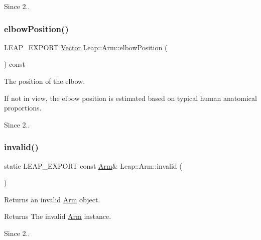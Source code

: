 \begin{DoxySince}{Since}
2.. 
\end{DoxySince}
\mbox{\label{class_leap_1_1_arm_a880ac49c9c85e9d45cd71497e0d08749}} 
\subsubsection{\texorpdfstring{elbow\+Position()}{elbowPosition()}}
{\footnotesize\ttfamily L\+E\+A\+P\+\_\+\+E\+X\+P\+O\+RT \hyperlink{struct_leap_1_1_vector}{Vector} Leap\+::\+Arm\+::elbow\+Position (\begin{DoxyParamCaption}{ }\end{DoxyParamCaption}) const}

The position of the elbow.


\begin{DoxyCodeInclude}
\end{DoxyCodeInclude}


If not in view, the elbow position is estimated based on typical human anatomical proportions.

\begin{DoxySince}{Since}
2.. 
\end{DoxySince}
\mbox{\label{class_leap_1_1_arm_aa7d54cfc4620732197439757a38bacce}} 
\subsubsection{\texorpdfstring{invalid()}{invalid()}}
{\footnotesize\ttfamily static L\+E\+A\+P\+\_\+\+E\+X\+P\+O\+RT const \hyperlink{class_leap_1_1_arm}{Arm}\& Leap\+::\+Arm\+::invalid (\begin{DoxyParamCaption}{ }\end{DoxyParamCaption})\hspace{0.3cm}{\ttfamily [static]}}

Returns an invalid \hyperlink{class_leap_1_1_arm}{Arm} object.


\begin{DoxyCodeInclude}
\end{DoxyCodeInclude}


\begin{DoxyReturn}{Returns}
The invalid \hyperlink{class_leap_1_1_arm}{Arm} instance. 
\end{DoxyReturn}
\begin{DoxySince}{Since}
2.. 
\end{DoxySince}
\mbox{\label{class_leap_1_1_arm_a1bcc12c7064493aced6f2f53eb617c24}} 

